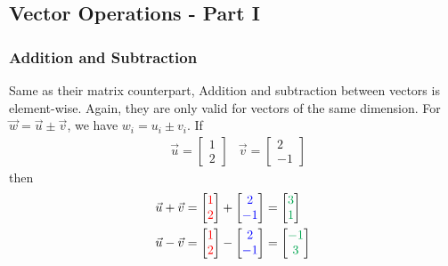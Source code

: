 \subsection{Vector Operations - Part I} 
\subsubsection{Addition and Subtraction}
Same as their matrix counterpart, Addition and subtraction between vectors is element-wise. Again, they are only valid for vectors of the same dimension. For $\vec{w} = \vec{u} \pm \vec{v}$, we have $w_i = u_i \pm v_i$. If
\begin{align*}
&\vec{u} =
\begin{bmatrix}
1 \\
2
\end{bmatrix}
&
\vec{v} =
\begin{bmatrix}
2 \\
-1
\end{bmatrix}
\end{align*}
then
\begin{align*}
\vec{u} + \vec{v} =
\begin{bmatrix}
\textcolor{red}{1} \\
\textcolor{red}{2}
\end{bmatrix}
+
\begin{bmatrix}
\textcolor{blue}{2} \\
\textcolor{blue}{-1}
\end{bmatrix}
&= 
\begin{bmatrix}
\textcolor{Green}{3} \\
\textcolor{Green}{1}
\end{bmatrix}
\\
\vec{u} - \vec{v} =
\begin{bmatrix}
\textcolor{red}{1} \\
\textcolor{red}{2}
\end{bmatrix}
-
\begin{bmatrix}
\textcolor{blue}{2} \\
\textcolor{blue}{-1}
\end{bmatrix}
&= 
\begin{bmatrix}
\textcolor{Green}{-1} \\
\textcolor{Green}{3}
\end{bmatrix}
\end{align*}
